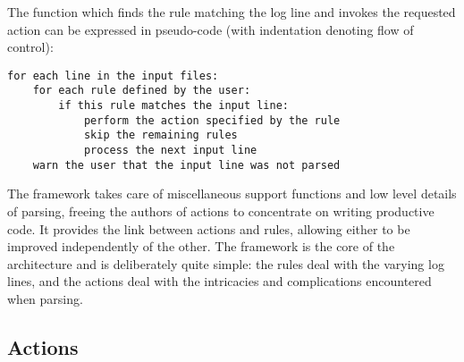 \documentclass[draft]{svmult}
\begin{document}
The function which finds the rule matching the log line and invokes the
requested action can be expressed in pseudo-code (with indentation denoting
flow of control):


\begin{verbatim}
for each line in the input files: 
    for each rule defined by the user: 
        if this rule matches the input line:
            perform the action specified by the rule
            skip the remaining rules
            process the next input line
    warn the user that the input line was not parsed
\end{verbatim}

The framework takes care of miscellaneous support functions and low level
details of parsing, freeing the authors of actions to concentrate on
writing productive code.  It provides the link between actions and rules,
allowing either to be improved independently of the other.  The framework
is the core of the architecture and is deliberately quite simple: the rules
deal with the varying log lines, and the actions deal with the intricacies
and complications encountered when parsing.

\subsection{Actions}

\label{Actions}
\end{document}
